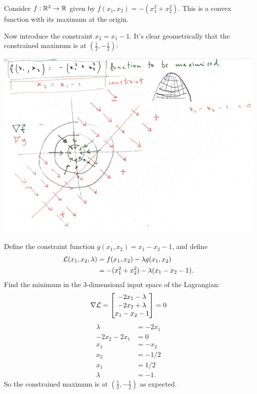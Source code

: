 \begin{example}
  Consider $f:\mathbb{R}^2 \to \mathbb{R}$ given by $f(x_1, x_2) = -(x_1^2 + x_2^2)$. This is a convex function with its maximum at the origin.

  Now introduce the constraint $x_2 = x_1 - 1$. It's clear geometrically that the constrained maximum
  is at $(\frac{1}{2}, -\frac{1}{2})$:
\begin{mdframed}
\includegraphics[width=400pt]{img/lagrange-multiplier-diag-1.png}
\end{mdframed}
  Define the constraint function $g(x_1, x_2) = x_1 - x_2 - 1$, and define
  \begin{align*}
    \mathcal{L}(x_1, x_2, \lambda)
    &= f(x_1, x_2) - \lambda g(x_1, x_2) \\
    &= -(x_1^2 + x_2^2) - \lambda(x_1 - x_2 - 1).
  \end{align*}
  Find the minimum in the 3-dimensional input space of the Lagrangian:
  \begin{align*}
    \nabla \mathcal{L} = \begin{bmatrix}-2x_1 - \lambda\\-2x_2 + \lambda\\x_1 - x_2 - 1\end{bmatrix} &= 0 \\
  \end{align*}
  \begin{align*}
    \lambda &= -2x_1 \\
    -2x_2 - 2x_1 &= 0 \\
    x_1 &= -x_2 \\
    x_2 &= -1/2 \\
    x_1 &= 1/2 \\
    \lambda &= -1.
  \end{align*}
  So the constrained maximum is at $(\frac{1}{2}, -\frac{1}{2})$ as expected.
\end{example}

